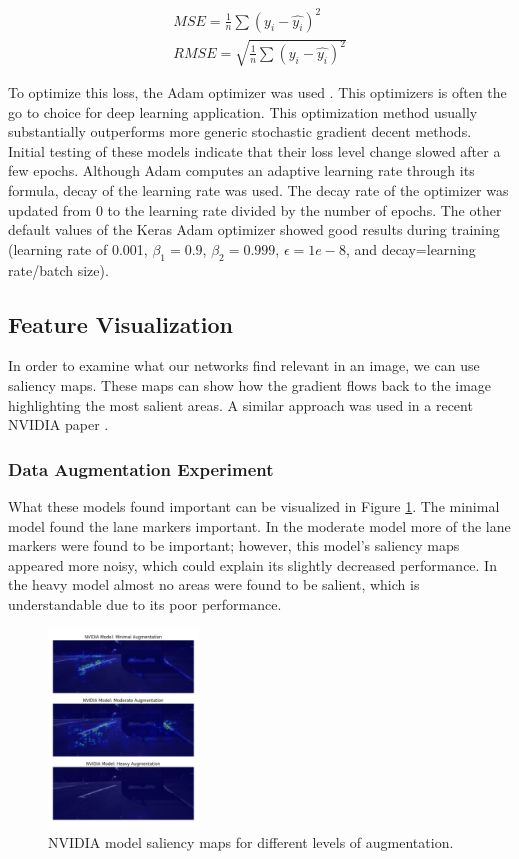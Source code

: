 \documentclass[10pt,twocolumn,letterpaper]{article}
\begin{document}
\begin{equation} \label{mse}
\begin{split}
MSE=\frac{1}{n} \sum (y_{i}-\hat{y_{i}})^{2}\\
RMSE=\sqrt{\frac{1}{n} \sum (y_{i}-\hat{y_{i}})^{2}} 
\end{split}
\end{equation}

To optimize this loss, the Adam optimizer was used \cite{kingma2014adam}. This optimizers is often the go to choice for deep learning application. This optimization method usually substantially outperforms more generic stochastic gradient decent methods. Initial testing of these models indicate that their loss level change slowed after a few epochs. Although Adam computes an adaptive learning rate through its formula, decay of the learning rate was used. The decay rate of the optimizer was updated from 0 to the learning rate divided by the number of epochs. The other default values of the Keras Adam optimizer showed good results during training (learning rate of 0.001, $\beta_{1}=0.9$, $\beta_{2}=0.999$, $\epsilon=1e-8$, and decay=learning rate/batch size).



\subsection{Feature Visualization}

In order to examine what our networks find relevant in an image, we can use saliency maps. These maps can show how the gradient flows back to the image highlighting the most salient areas. A similar approach was used in a recent NVIDIA paper \cite{bojarski2017explaining}.

\subsubsection{Data Augmentation Experiment}
What these models found important can be visualized in Figure \ref{nvidia_aug}. The minimal model found the lane markers important. In the moderate model more of the lane markers were found to be important; however, this model's saliency maps appeared more noisy, which could explain its slightly decreased performance. In the heavy model almost no areas were found to be salient, which is understandable due to its poor performance. 

 \begin{figure}[!htb]
	\includegraphics[width=4cm]{nvidia_aug_test_vert.png}
	\centering
	\caption{NVIDIA model saliency maps for different levels of augmentation.}
	\label{nvidia_aug}
\end{figure}
\end{document}
